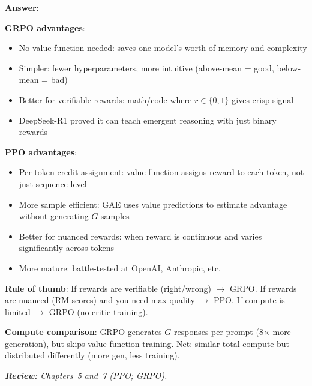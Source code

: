 \begin{questionbox}
\textbf{Answer}:

\textbf{GRPO advantages}:

\begin{itemize}
  \item No value function needed: saves one model’s worth of memory and complexity
  \item Simpler: fewer hyperparameters, more intuitive (above-mean = good, below-mean = bad)
  \item Better for verifiable rewards: math/code where $r \in \{0, 1\}$ gives crisp signal
  \item DeepSeek-R1 proved it can teach emergent reasoning with just binary rewards
\end{itemize}

\textbf{PPO advantages}:

\begin{itemize}
  \item Per-token credit assignment: value function assigns reward to each token, not just sequence-level
  \item More sample efficient: GAE uses value predictions to estimate advantage without generating $G$ samples
  \item Better for nuanced rewards: when reward is continuous and varies significantly across tokens
  \item More mature: battle-tested at OpenAI, Anthropic, etc.
\end{itemize}

\textbf{Rule of thumb}: If rewards are verifiable (right/wrong) $\rightarrow$ GRPO. If rewards are nuanced (RM scores) and you need max quality $\rightarrow$ PPO. If compute is limited $\rightarrow$ GRPO (no critic training).

\textbf{Compute comparison}: GRPO generates $G$ responses per prompt (8$\times$ more generation), but skips value function training. Net: similar total compute but distributed differently (more gen, less training).

\emph{\textbf{Review:} Chapters~5 and~7 (PPO; GRPO).}
\end{questionbox}

